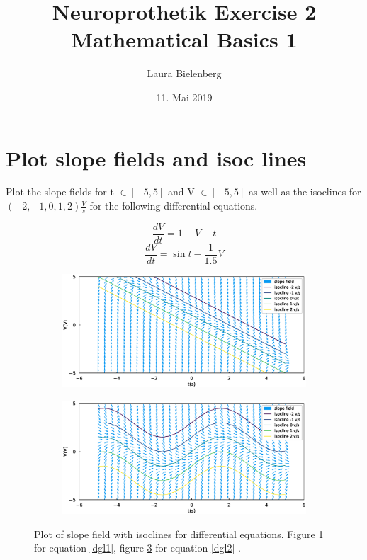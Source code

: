 \documentclass{scrartcl}			%
\title{Neuroprothetik Exercise 2 \\ Mathematical Basics 1}
\author{ Laura Bielenberg }
\date{11. Mai 2019}
\begin{document}

\maketitle

\section{Plot slope fields and isoc lines}		%

Plot the slope fields for t $\in [−5, 5 ]$ and V $\in [−5, 5 ] $ as well as the isoclines for $(-2, -1, 0, 1, 2) \frac{V}{s}$ for the following differential equations.

\begin{equation}
	\frac{dV}{dt} = 1 - V - t
	\label{dgl1}
\end{equation}
\begin{equation}
	\frac{dV}{dt} = \sin{t} - \frac{1}{1.5}V
	\label{dgl2}
\end{equation}

\begin{figure}[H]	
	\centering
	\begin{subfigure}[b]{\textwidth}			%
		\includegraphics[width=1\linewidth]{imgs/isoclines_DGL_1.eps}
		\caption{}
		\label{fig:dgl1} %
	\end{subfigure}

	\begin{subfigure}[b]{\textwidth}					%
		\includegraphics[width=1\linewidth]{imgs/isoclines_DGL_2.eps}
		\caption{}
		\label{fig:dgl2} %
	\end{subfigure}
	\caption{Plot of slope field with isoclines for differential equations. Figure \ref{fig:dgl1} for equation \ref{dgl1},  figure \ref{fig:dgl2} for equation \ref{dgl2} . }
\end{figure}
\end{document}
